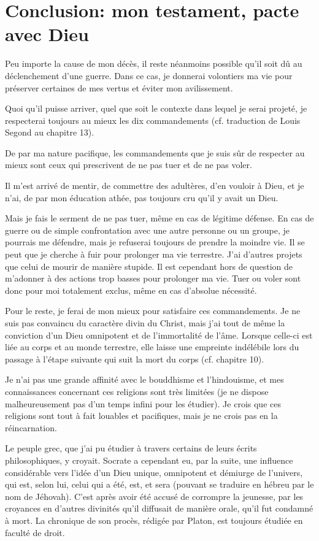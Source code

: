 \chapter{Conclusion: mon testament, pacte avec Dieu}

Peu importe la cause de mon décès, il reste néanmoins possible qu’il soit dû au déclenchement d’une guerre. Dans ce cas, je donnerai volontiers ma vie pour préserver certaines de mes vertus et éviter mon avilissement.

Quoi qu’il puisse arriver, quel que soit le contexte dans lequel je serai projeté, je respecterai toujours au mieux les dix commandements (cf. traduction de Louis Segond au chapitre 13).

De par ma nature pacifique, les commandements que je suis sûr de respecter au mieux sont ceux qui prescrivent de ne pas tuer et de ne pas voler.

Il m’est arrivé de mentir, de commettre des adultères, d’en vouloir à Dieu, et je n’ai, de par mon éducation athée, pas toujours cru qu’il y avait un Dieu.

Mais je fais le serment de ne pas tuer, même en cas de légitime défense. En cas de guerre ou de simple confrontation avec une autre personne ou un groupe, je pourrais me défendre, mais je refuserai toujours de prendre la moindre vie. Il se peut que je cherche à fuir pour prolonger ma vie terrestre. J’ai d’autres projets que celui de mourir de manière stupide. Il est cependant hors de question de m’adonner à des actions trop basses pour prolonger ma vie. Tuer ou voler sont donc pour moi totalement exclus, même en cas d’absolue nécessité.

Pour le reste, je ferai de mon mieux pour satisfaire ces commandements. Je ne suis pas convaincu du caractère divin du Christ, mais j’ai tout de même la conviction d’un Dieu omnipotent et de l’immortalité de l’âme. Lorsque celle-ci est liée au corps et au monde terrestre, elle laisse une empreinte indélébile lors du passage à l’étape suivante qui suit la mort du corps (cf. chapitre 10).

Je n’ai pas une grande affinité avec le bouddhisme et l’hindouisme, et mes connaissances concernant ces religions sont très limitées (je ne dispose malheureusement pas d’un temps infini pour les étudier). Je crois que ces religions sont tout à fait louables et pacifiques, mais je ne crois pas en la réincarnation.

Le peuple grec, que j’ai pu étudier à travers certains de leurs écrits philosophiques, y croyait. Socrate a cependant eu, par la suite, une influence considérable vers l’idée d’un Dieu unique, omnipotent et démiurge de l’univers, qui est, selon lui, celui qui a été, est, et sera (pouvant se traduire en hébreu par le nom de Jéhovah). C’est après avoir été accusé de corrompre la jeunesse, par les croyances en d'autres divinités qu’il diffusait de manière orale, qu’il fut condamné à mort. La chronique de son procès, rédigée par Platon, est toujours étudiée en faculté de droit.


